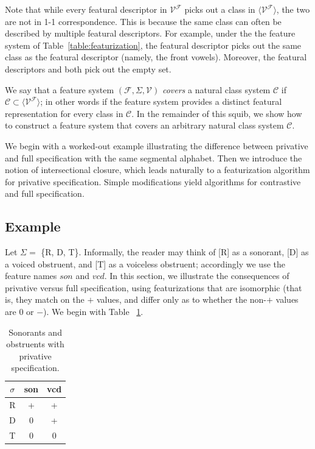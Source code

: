 \documentclass[11pt, oneside]{article}   	%
\begin{document}
Note that while every featural descriptor in $\mathcal V^\mathcal F$ picks out a class in $\langle \mathcal V^\mathcal F \rangle$, the two are not in 1-1 correspondence. This is because the same class can often be described by multiple featural descriptors. For example, under the the feature system of Table~\ref{table:featurization}, the featural descriptor  picks out the same class as the featural descriptor  (namely, the front vowels). Moreover, the featural descriptors  and  both pick out the empty set.

\vspace{\baselineskip} We say that a feature system $(\mathcal F, \Sigma, \mathcal V)$ \textit{covers} a natural class system $\mathcal C$ if $\mathcal C \subset \langle \mathcal V^\mathcal F \rangle$; in other words if the feature system provides a distinct featural representation for every class in $\mathcal C$. In the remainder of this squib, we show how to construct a feature system that covers an arbitrary natural class system $\mathcal C$.

We begin with a worked-out example illustrating the difference between privative and full specification with the same segmental alphabet. Then we introduce the notion of intersectional closure, which leads naturally to a featurization algorithm for privative specification. Simple modifications yield algorithms for contrastive and full specification.

\subsection{Example}

Let $\Sigma =$ \{R, D, T\}. Informally, the reader may think of [R] as a sonorant, [D] as a voiced obstruent, and [T] as a voiceless obstruent; accordingly we use the feature names $son$ and $vcd$. In this section, we illustrate the consequences of privative versus full specification, using featurizations that are isomorphic (that is, they match on the $+$ values, and differ only as to whether the non-$+$ values are $0$ or $-$). We begin with Table ~\ref{table:privative}.

\begin{table}[h]
    \centering
    \begin{tabular} {|c||c|c|}
    \hline
        $\sigma$ & son & vcd \\ \hline
        R & + & + \\
        D & 0 & + \\
        T & 0 & 0 \\
        \hline
    \end{tabular}
    \caption{Sonorants and obstruents with privative specification.}
    \label{table:privative}
\end{table}
\end{document}
